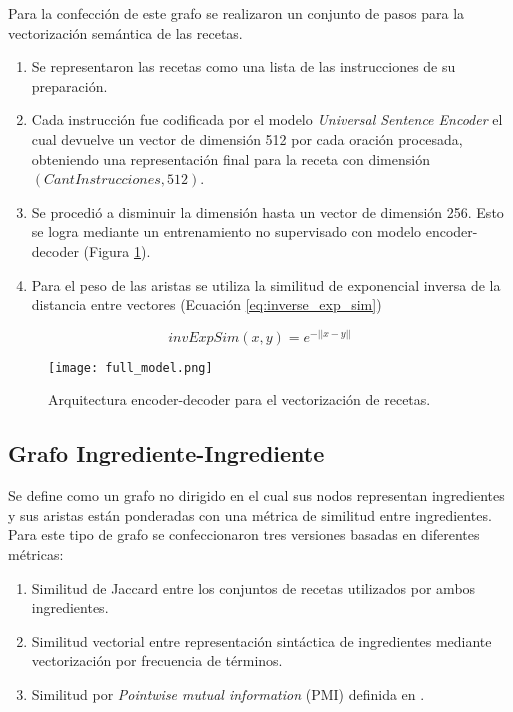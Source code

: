 \documentclass[
	a4paper, %
	10pt, %
	unnumberedsections, %
	twoside, %
]{LTJournalArticle}
\begin{document}
Para la confección de este grafo se realizaron un conjunto de pasos para la vectorización semántica de las recetas.

\begin{enumerate}
	\item Se representaron las recetas como una lista de las instrucciones de su preparación.
	\item Cada instrucción fue codificada por el modelo \textit{Universal Sentence Encoder} \autocite{Smith:2023qr}
	el cual devuelve un vector de dimensión 512 por cada oración procesada, obteniendo una representación final
	para la receta con dimensión $(CantInstrucciones, 512)$. 
	\item Se procedió a disminuir la dimensión hasta un vector de dimensión 256. Esto se logra mediante un 
	entrenamiento no supervisado con modelo encoder-decoder (Figura \ref{fig:encoder_decoder_small}).
	\item Para el peso de las aristas se utiliza la similitud de exponencial inversa de la distancia entre vectores 
	(Ecuación \ref{eq:inverse_exp_sim})
\end{enumerate}

\begin{equation}
	invExpSim(x, y) = e^{-||x-y||}
	\label{eq:inverse_exp_sim}
\end{equation}

\begin{figure}
	\texttt{[image: full\_model.png]}
	\caption{Arquitectura encoder-decoder para el vectorización de recetas.}
	\label{fig:encoder_decoder_small}
\end{figure}

\subsection{Grafo Ingrediente-Ingrediente}

Se define como un grafo no dirigido en el cual sus nodos representan ingredientes y sus aristas
están ponderadas con una métrica de similitud entre ingredientes. 
Para este tipo de grafo se confeccionaron tres versiones basadas en diferentes métricas:

\begin{enumerate}
	\item Similitud de Jaccard entre los conjuntos de recetas utilizados por ambos ingredientes.
	\item Similitud vectorial entre representación sintáctica de ingredientes mediante vectorización 
	por frecuencia de términos.
	\item Similitud por \textit{Pointwise mutual information} (PMI) definida en \textcite{teng2012recipe}.
\end{enumerate}
\end{document}
